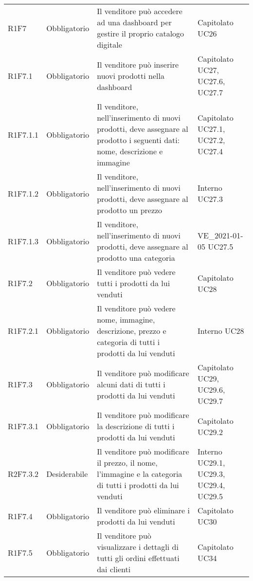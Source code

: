 {\begin{longtable}{C{2.5cm} C{2.8cm} C{6.7cm} C{2.5cm}}
R1F7 & Obbligatorio & Il venditore può accedere ad una dashboard per gestire il proprio catalogo digitale & Capitolato \newline UC26\\
R1F7.1 & Obbligatorio & Il venditore può inserire nuovi prodotti nella dashboard & Capitolato \newline UC27, UC27.6, UC27.7\\
R1F7.1.1 & Obbligatorio & Il venditore, nell'inserimento di nuovi prodotti, deve assegnare al prodotto i seguenti dati: nome, descrizione e immagine & Capitolato \newline UC27.1, UC27.2, UC27.4\\
R1F7.1.2 & Obbligatorio & Il venditore, nell'inserimento di nuovi prodotti, deve assegnare al prodotto un prezzo & Interno \newline UC27.3\\ 
R1F7.1.3 & Obbligatorio & Il venditore, nell'inserimento di nuovi prodotti, deve assegnare al prodotto una categoria & VE\_2021-01-05 \newline UC27.5\\ 
R1F7.2 & Obbligatorio & Il venditore può vedere tutti i prodotti da lui venduti & Capitolato \newline UC28 \\
R1F7.2.1 & Obbligatorio & Il venditore può vedere nome, immagine, descrizione, prezzo e categoria di tutti i prodotti da lui venduti & Interno \newline UC28\\
R1F7.3 & Obbligatorio & Il venditore può modificare alcuni dati di tutti i prodotti da lui venduti & Capitolato \newline UC29, UC29.6, UC29.7 \\
R1F7.3.1 & Obbligatorio & Il venditore può modificare la descrizione di tutti i prodotti da lui venduti & Capitolato \newline UC29.2\\
R2F7.3.2 & Desiderabile & Il venditore può modificare il prezzo, il nome, l'immagine e la categoria di tutti i prodotti da lui venduti & Interno \newline UC29.1, UC29.3, UC29.4, UC29.5\\
R1F7.4 & Obbligatorio & Il venditore può eliminare i prodotti da lui venduti & Capitolato \newline UC30 \\
R1F7.5 & Obbligatorio & Il venditore può visualizzare i dettagli di tutti gli ordini effettuati dai clienti & Capitolato \newline UC34\\

\end{longtable}}
